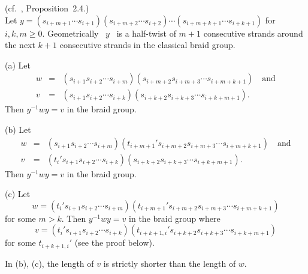 \addtocounter{thm}{1}
\begin{lem} {\rm (cf.\ \cite{GP}, Proposition~2.4.)}\\
Let  $y=(s_{i+m+1}  \cdots s_{i+1})  (s_{i+m+2} \cdots s_{i+2}) \cdots
(s_{i+m+k+1} \cdots s_{i+k+1})$ for $i,k,m \geq 0$. Geometrically
\ $y$ \ is  a half-twist of  $m+1$ consecutive strands around the next
$k+1$ consecutive strands in the classical braid group.

(a) Let
\begin{eqnarray*} 
w & = & (s_{i+1} s_{i+2} \cdots s_{i+m}) (s_{i+m+2} 
s_{i+m+3} \cdots s_{i+m+k+1}) \quad \mbox{and}\\ 
v & = & (s_{i+1} s_{i+2} \cdots s_{i+k}) (s_{i+k+2} s_{i+k+3} \cdots 
s_{i+k+m+1}).  \end{eqnarray*}
Then $y^{-1}wy=v$  in the braid group.

(b) Let 
\begin{eqnarray*}
w & = & (s_{i+1} s_{i+2} \cdots s_{i+m}) (t_{i+m+1}'s_{i+m+2} 
s_{i+m+3} \cdots s_{i+m+k+1}) \quad \mbox{and} \\
v & = & (t_i's_{i+1} s_{i+2} \cdots s_{i+k}) (s_{i+k+2} s_{i+k+3} \cdots 
s_{i+k+m+1}).  \end{eqnarray*}
Then $y^{-1}wy=v$ in the braid group.

(c) Let \[w = (t_i's_{i+1} s_{i+2} \cdots s_{i+m}) (t_{i+m+1}'s_{i+m+2} 
s_{i+m+3} \cdots s_{i+m+k+1})\] for some $m>k$. Then $y^{-1}wy=v$ in the 
braid group where
\[ v  = (t_i's_{i+1} s_{i+2} \cdots s_{i+k})(t_{i+k+1,i}'s_{i+k+2} s_{i+k+3}
 \cdots s_{i+k+m+1})\] for some $t_{i+k+1,i}'$ (see the proof below).

In (b), (c), the length of $v$ is strictly shorter than the length of $w$.
\end{lem}

